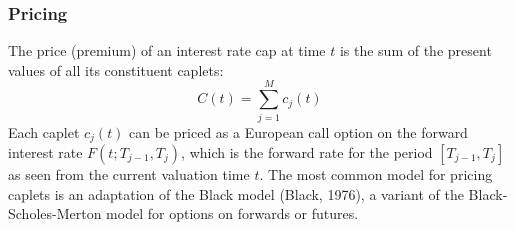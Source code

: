 \documentclass[11pt, a4paper, british]{article}
\begin{document}
\subsubsection{Pricing}
The price (premium) of an interest rate cap at time $t$ is the sum of the present values of all its constituent caplets:
\begin{equation}
 C(t) = \sum_{j=1}^{M} c_j(t)
 \label{eq:cap_price_sum_caplets}
\end{equation}
Each caplet $c_j(t)$ can be priced as a European call option on the forward interest rate $F(t; T_{j-1}, T_j)$, which is the forward rate for the period $[T_{j-1}, T_j]$ as seen from the current valuation time $t$. The most common model for pricing caplets is an adaptation of the Black model (Black, 1976), a variant of the Black-Scholes-Merton model for options on forwards or futures.
\end{document}
